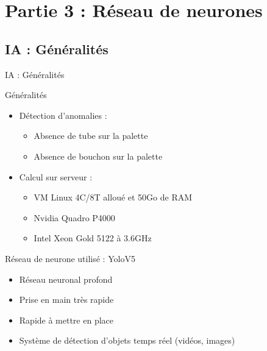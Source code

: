 \section{Partie 3 : Réseau de neurones}
    \subsection{IA : Généralités}
        \begin{frame}[allowframebreaks]{IA : Généralités}
            \begin{block}{Généralités}
                \begin{itemize}
                    [square]
                    \item Détection d'anomalies :
                        \begin{itemize}
                            \item Absence de tube sur la palette
                            \item Absence de bouchon sur la palette
                        \end{itemize}
                    \item Calcul sur serveur :
                        \begin{itemize}
                            \item VM Linux 4C/8T alloué et 50Go de RAM
                            \item Nvidia Quadro P4000
                            \item Intel Xeon Gold 5122 à 3.6GHz
                        \end{itemize}
                \end{itemize}
            \end{block}
            
            \begin{block}{Réseau de neurone utilisé : YoloV5}
                \begin{itemize}
                    [square]
                    \item Réseau neuronal profond
                    \item Prise en main très rapide
                    \item Rapide à mettre en place
                    \item Système de détection d'objets temps réel (vidéos, images)
                \end{itemize}
            \end{block}
           
        \end{frame}
%
